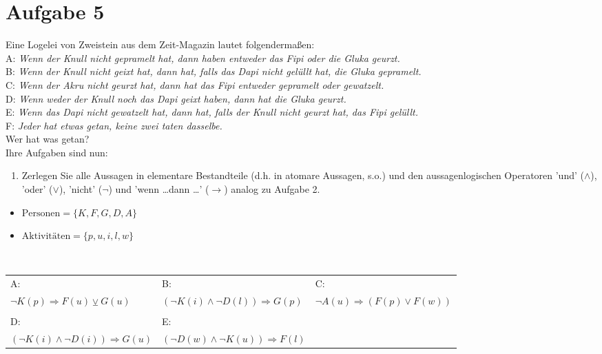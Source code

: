\section*{Aufgabe 5}

Eine Logelei von Zweistein aus dem Zeit-Magazin lautet folgendermaßen:\\

A: \textit{Wenn der Knull nicht gepramelt hat, dann haben entweder das Fipi oder die Gluka geurzt.}\\

B: \textit{Wenn der Knull nicht geixt hat, dann hat, falls das Dapi nicht gelüllt hat, die Gluka gepramelt.}\\

C: \textit{Wenn der Akru nicht geurzt hat, dann hat das Fipi entweder gepramelt oder gewatzelt.}\\

D: \textit{Wenn weder der Knull noch das Dapi geixt haben, dann hat die Gluka geurzt.}\\

E: \textit{Wenn das Dapi nicht gewatzelt hat, dann hat, falls der Knull nicht geurzt hat, das Fipi gelüllt.}\\

F: \textit{Jeder hat etwas getan, keine zwei taten dasselbe.}\\

Wer hat was getan?\\

Ihre Aufgaben sind nun:

\begin{enumerate}[label={a)}, leftmargin=*]
    \item Zerlegen Sie alle Aussagen in elementare Bestandteile (d.h. in atomare Aussagen, s.o.) und den aussagenlogischen Operatoren 'und' ($\land$), 'oder' ($\lor$), 'nicht' ($\neg$) und 'wenn \dots dann \dots ' ($\rightarrow$) analog zu Aufgabe 2.
\end{enumerate}

\begin{itemize}[leftmargin=*]
\item $\text{Personen} = \{ K, F, G, D, A\}$
\item $\text{Aktivitäten} = \{p, u, i, l , w\}$
\end{itemize}\

\begin{tabularx}{\textwidth}{XXX}
A: & B: & C:\\
$\neg K(p) \Rightarrow F(u) \veebar G(u)$ & $(\neg K(i) \land \neg D(l)) \Rightarrow G(p)$ & $\lnot A(u) \Rightarrow (F(p) \lor F(w))$\\
& &\\
D: & E: &\\
$(\neg K(i) \land \neg D(i)) \Rightarrow G(u)$ & $(\neg D(w) \land \neg K(u)) \Rightarrow F(l)$ &
\end{tabularx}

